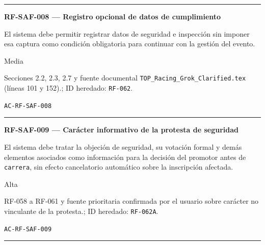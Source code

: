 \documentclass[10pt,letterpaper]{article}
\begin{document}
\vspace{0.25em}\hrule\vspace{0.65em}
\noindent\textbf{RF-SAF-008 --- Registro opcional de datos de cumplimiento}\par
\begin{description}[style=nextline,leftmargin=3.15cm,labelwidth=2.8cm,font=\normalfont\bfseries]
\item[Obligación] El sistema debe permitir registrar datos de seguridad e inspección sin imponer esa captura como condición obligatoria para continuar con la gestión del evento.
\item[Prioridad] Media
\item[Procedencia] Secciones 2.2, 2.3, 2.7 y fuente documental \texttt{TOP\_Racing\_Grok\_Clarified.tex} (líneas 101 y 152).; ID heredado: \texttt{RF-062}.
\item[Verificación] \texttt{AC-RF-SAF-008}
\end{description}
\vspace{0.25em}\hrule\vspace{0.65em}
\noindent\textbf{RF-SAF-009 --- Carácter informativo de la protesta de seguridad}\par
\begin{description}[style=nextline,leftmargin=3.15cm,labelwidth=2.8cm,font=\normalfont\bfseries]
\item[Obligación] El sistema debe tratar la objeción de seguridad, su votación formal y demás elementos asociados como información para la decisión del promotor antes de \texttt{carrera}, sin efecto cancelatorio automático sobre la inscripción afectada.
\item[Prioridad] Alta
\item[Procedencia] RF-058 a RF-061 y fuente prioritaria confirmada por el usuario sobre carácter no vinculante de la protesta.; ID heredado: \texttt{RF-062A}.
\item[Verificación] \texttt{AC-RF-SAF-009}
\end{description}
\vspace{0.25em}\hrule\vspace{0.65em}
\end{document}
